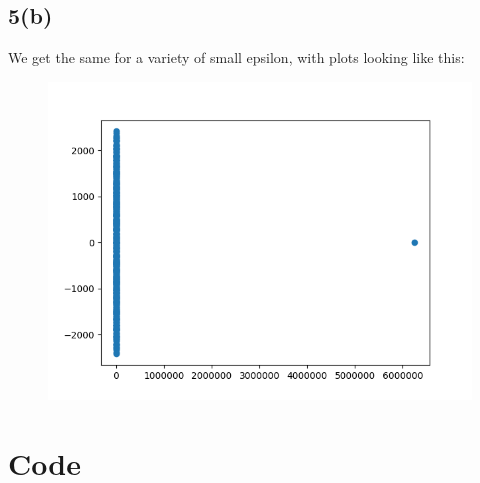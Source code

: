 \documentclass[11pt]{article}
\begin{document}
\subsection*{5(b)}
We get the same for a variety of small epsilon, with plots looking like this:\\
\begin{figure}[H]
	\includegraphics[scale=0.7]{HW/hw3p5}
	\label{fig:hw3p5}
\end{figure}


\section*{Code}
\end{document}
